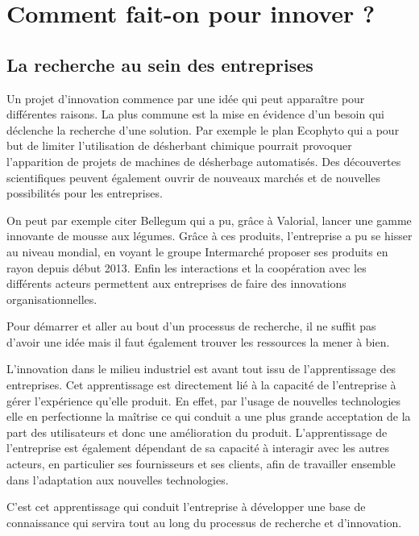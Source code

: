 \documentclass[a4paper,10pt]{report}
\begin{document}
	\section{Comment fait-on pour innover ?}
			
		\subsection{La recherche au sein des entreprises}
			Un projet d’innovation commence par une idée qui peut apparaître pour différentes raisons. La plus commune est la mise en évidence d’un besoin qui déclenche la recherche d’une solution. Par exemple le plan Ecophyto\cite{RobotsChamps} qui a pour but de limiter l’utilisation de désherbant chimique pourrait provoquer l’apparition de projets de machines de désherbage automatisés. 
			Des découvertes scientifiques peuvent également ouvrir de nouveaux marchés et de nouvelles possibilités pour les entreprises. 
			
			On peut par exemple citer Bellegum\cite{Bellegum} qui a pu, grâce à Valorial, lancer une gamme innovante de mousse aux légumes. Grâce à ces produits, l’entreprise a pu se hisser au niveau mondial, en voyant le groupe Intermarché proposer ses produits en rayon depuis début 2013.
			Enfin les interactions et la coopération avec les différents acteurs permettent aux entreprises de faire des innovations organisationnelles.
			
			Pour démarrer et aller au bout d’un processus de recherche, il ne suffit pas d’avoir une idée mais il faut également trouver les ressources la mener à bien.
			
			L’innovation dans le milieu industriel est avant tout issu de l’apprentissage des entreprises. Cet apprentissage est directement lié à la capacité de l’entreprise à gérer l’expérience qu’elle produit. En effet, par l’usage de nouvelles technologies elle en perfectionne la maîtrise ce qui conduit a une plus grande acceptation de la part des utilisateurs et donc une amélioration du produit. 
			L’apprentissage de l’entreprise est également dépendant de sa capacité à interagir avec les autres acteurs, en particulier ses fournisseurs et ses clients, afin de travailler ensemble dans l’adaptation aux nouvelles technologies.
			
			C’est cet apprentissage qui conduit l’entreprise à développer une base de connaissance qui servira tout au long du processus de recherche et d’innovation.
			
\end{document}
